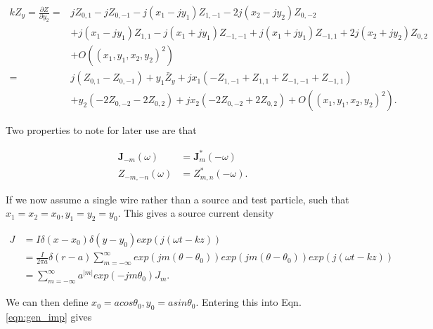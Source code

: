 \documentclass[review, number, sort&compress]{elsarticle}
\begin{document}
\begin{align}
kZ_{y} =\frac{\partial Z}{\partial y_{2}} = & jZ_{0,1} - jZ_{0,-1} - j\left( x_{1} - jy_{1} \right) Z_{1,-1} - 2j\left( x_{2} - jy_{2} \right) Z_{0,-2} \nonumber \\
						&+ j\left( x_{1} - jy_{1} \right) Z_{1,1} - j\left( x_{1} + jy_{1} \right) Z_{-1,-1} + j\left( x_{1} + jy_{1} \right) Z_{-1,1} + 2j\left( x_{2} + jy_{2} \right) Z_{0,2} \nonumber \\
						& + O\left( \left( x_{1},y_{1},x_{2},y_{2} \right)^{2} \right) \nonumber \\
						= & j\left(Z_{0,1} - Z_{0,-1} \right)+ y_{1}\bar{Z}_{y} + jx_{1} \left( -Z_{1,-1} + Z_{1,1} + Z_{-1,-1} + Z_{-1,1} \right) \nonumber \\
						& + y_{2}\left(- 2Z_{0,-2} - 2Z_{0,2}  \right) + jx_{2}\left( -2Z_{0,-2} + 2Z_{0,2}  \right) +  O\left( \left( x_{1},y_{1},x_{2},y_{2} \right)^{2} \right).
\end{align}

Two properties to note for later use are that

\begin{align}
\textbf{J}_{-m} \left( \omega \right) & = \textbf{J}_{m}^{*} \left( -\omega \right) \\
Z_{-m,-n} \left( \omega \right) & = Z_{m,n}^{*} \left( -\omega \right).
\end{align}

If we now assume a single wire rather than a source and test particle, such that $x_{1}=x_{2}=x_{0}, y_{1}=y_{2}=y_{0}$. This gives a source current density

\begin{align}
J & = I \delta \left( x-x_{0} \right)\delta \left( y-y_{0} \right) exp\left( j \left(\omega t -kz \right)\right) \nonumber \\
  & = \frac{I}{2\pi a} \delta \left( r-a \right)\displaystyle\sum\limits_{m=-\infty}^{\infty} exp\left( jm \left( \theta -\theta_{0} \right) \right) exp\left( jm \left( \theta -\theta_{0} \right) \right) exp\left( j \left( \omega t - kz \right) \right) \nonumber \\
  & = \displaystyle\sum\limits_{m=-\infty}^{\infty} a^{|m|}exp\left( -jm\theta_{0} \right)J_{m}.
\end{align}

We can then define $x_{0}=acos\theta_{0}, y_{0}=asin\theta_{0}$. Entering this into Eqn. \ref{eqn:gen_imp} gives
\end{document}
